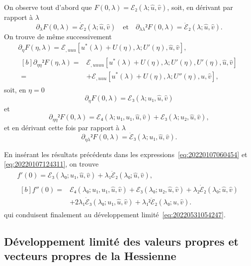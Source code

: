 \documentclass[12pt, final]{scrartcl}
\theoremstyle{definition}
\begin{document}
On observe tout d'abord que \(F(0, λ) =ℰ₂(λ; \hat{u}, \hat{v})\), soit, en
dérivant par rapport à \(λ\)
\begin{equation}
  ∂_{λ} F(0, λ) = \dot{ℰ}₂(λ; \hat{u}, \hat{v})
  \quad \text{et} \quad
  ∂_{λ λ}² F(0, λ) = \ddot{ℰ}₂(λ; \hat{u}, \hat{v}).
\end{equation}
On trouve de même successivement
\begin{gather}
  ∂_{η} F(η, λ) = ℰ_{, u u u} [u^{\ast}(λ) + U(η), λ; U'(η), \hat{u}, \hat{v}],\\
  \begin{aligned}[b]
    ∂_{η η}² F(η, λ)
    ={} & ℰ_{, u u u u} [u^{\ast}(λ) + U(η), λ ; U'(η), U'(η), \hat{u}, \hat{v}] \\
    ={} & +ℰ_{, u u u} [u^{\ast}(λ) + U(η), λ; U''(η), \hat{u}, \hat{v}],
  \end{aligned}
\end{gather}
soit, en \(η = 0\)
\begin{equation}
  ∂_{η} F(0, λ) = ℰ₃(λ; u₁, \hat{u}, \hat{v})
\end{equation}
et
\begin{equation}
  ∂_{η η}² F(0, λ) = ℰ₄(λ ; u₁, u₁, \hat{u}, \hat{v}) + ℰ₃(λ; u₂, \hat{u}, \hat{v}),
\end{equation}
et en dérivant cette fois par rapport à \(λ\)
\begin{equation}
  ∂_{η λ}² F(0, λ) = \dot{ℰ}₃(λ; u₁, \hat{u}, \hat{v}).
\end{equation}

En insérant les résultats précédents dans les
expressions~\eqref{eq:20220107060454} et \eqref{eq:20220107124311}, on trouve
\begin{gather}
  f'(0) =ℰ₃(λ₀; u₁, \hat{u}, \hat{v}) + λ₁ \dot{ℰ}₂(λ₀; \hat{u}, \hat{v}),\\
  \begin{aligned}[b]
    f''(0)
    ={} & ℰ₄(λ₀; u₁, u₁, \hat{u}, \hat{v}) +ℰ₃(λ₀; u₂, \hat{u}, \hat{v}) + λ₂ \dot{ℰ}₂(λ₀; \hat{u}, \hat{v})\\
    & + 2 λ₁ \dot{ℰ}₃(λ₀ ; u₁, \hat{u}, \hat{v}) + λ₁² \ddot{ℰ}₂(λ₀ ; \hat{u}, \hat{v}).
  \end{aligned}
\end{gather}
qui conduisent finalement au développement limité~\eqref{eq:20220531054247}.

\subsection{Développement limité des valeurs propres et vecteurs
propres de la Hessienne}
\end{document}
